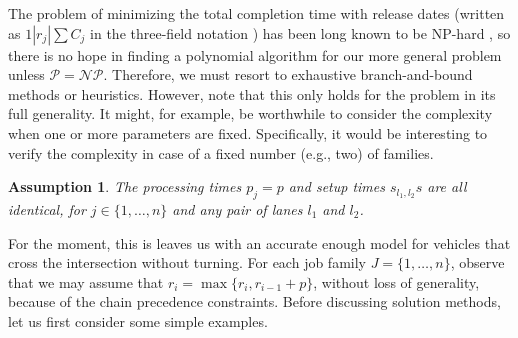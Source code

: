 \documentclass{article}
\theoremstyle{definition}
\theoremstyle{plain}
\newtheorem{assump}{Assumption}[section]
\begin{document}
The problem of minimizing the total completion time with release dates (written
as $1 | r_{j} | \sum C_{j}$ in the three-field notation
\cite{grahamOptimizationApproximationDeterministic1979}) has been long known to
be NP-hard \cite{lenstraComplexityMachineScheduling1977}, so there is no hope in
finding a polynomial algorithm for our more general problem unless
$\mathcal{P} = \mathcal{NP}$. Therefore, we must resort to exhaustive
branch-and-bound methods or heuristics. However, note that this only holds for
the problem in its full generality. It might, for example, be worthwhile to
consider the complexity when one or more parameters are fixed. Specifically, it
would be interesting to verify the complexity in case of a fixed number (e.g.,
two) of families.

\begin{assump}
  The processing times $p_{j} = p$ and setup times $s_{l_{1},l_{2}}s$ are all
  identical, for $j \in \{1, \dots, n\}$ and any pair of lanes $l_{1}$ and
  $l_{2}$.
\end{assump}
For the moment, this is leaves us with an accurate enough model for vehicles
that cross the intersection without turning. For each job family
$J = \{ 1, \dots, n \}$, observe that we may assume that
$r_{i} = \max\{ r_{i}, r_{i-1} + p \}$, without loss of generality, because of
the chain precedence constraints. Before discussing solution methods, let us
first consider some simple examples.
\end{document}
